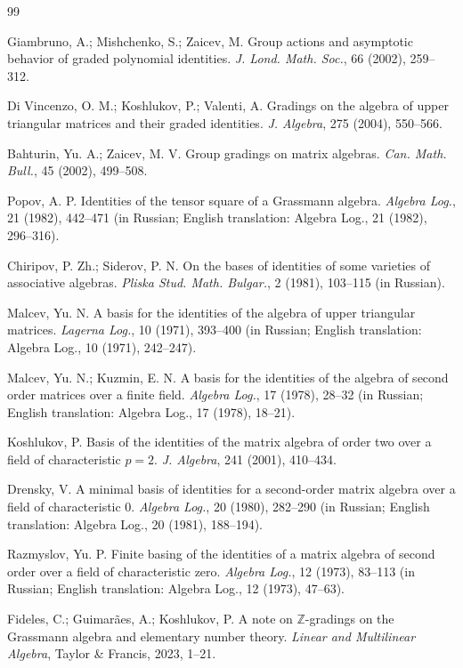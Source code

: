 \documentclass{article}
\begin{document}
	
	\begin{thebibliography}{99}
		
		 Giambruno, A.; Mishchenko, S.; Zaicev, M. Group actions and asymptotic behavior of graded polynomial identities. \textit{J. Lond. Math. Soc.}, 66 (2002), 259–312.
		
		 Di Vincenzo, O. M.; Koshlukov, P.; Valenti, A. Gradings on the algebra of upper triangular matrices and their graded identities. \textit{J. Algebra}, 275 (2004), 550–566.
		
		 Bahturin, Yu. A.; Zaicev, M. V. Group gradings on matrix algebras. \textit{Can. Math. Bull.}, 45 (2002), 499–508.
		
		 Popov, A. P. Identities of the tensor square of a Grassmann algebra. \textit{Algebra Log.}, 21 (1982), 442–471 (in Russian; English translation: Algebra Log., 21 (1982), 296–316).
		
		 Chiripov, P. Zh.; Siderov, P. N. On the bases of identities of some varieties of associative algebras. \textit{Pliska Stud. Math. Bulgar.}, 2 (1981), 103–115 (in Russian).
		
		 Malcev, Yu. N. A basis for the identities of the algebra of upper triangular matrices. \textit{Lagerna Log.}, 10 (1971), 393–400 (in Russian; English translation: Algebra Log., 10 (1971), 242–247).
		
		 Malcev, Yu. N.; Kuzmin, E. N. A basis for the identities of the algebra of second order matrices over a finite field. \textit{Algebra Log.}, 17 (1978), 28–32 (in Russian; English translation: Algebra Log., 17 (1978), 18–21).
		
		 Koshlukov, P. Basis of the identities of the matrix algebra of order two over a field of characteristic $p=2$. \textit{J. Algebra}, 241 (2001), 410–434.
		
		 Drensky, V. A minimal basis of identities for a second-order matrix algebra over a field of characteristic 0. \textit{Algebra Log.}, 20 (1980), 282–290 (in Russian; English translation: Algebra Log., 20 (1981), 188–194).
		
		 Razmyslov, Yu. P. Finite basing of the identities of a matrix algebra of second order over a field of characteristic zero. \textit{Algebra Log.}, 12 (1973), 83–113 (in Russian; English translation: Algebra Log., 12 (1973), 47–63).
		
		 Fideles, C.; Guimarães, A.; Koshlukov, P. A note on $\mathbb{Z}$-gradings on the Grassmann algebra and elementary number theory. \textit{Linear and Multilinear Algebra}, Taylor \& Francis, 2023, 1–21.
		

\end{thebibliography}
\end{document}
